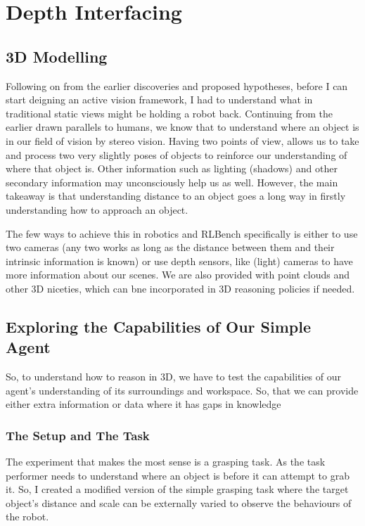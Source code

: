 \section{Depth Interfacing} 


\subsection{3D Modelling} 
Following on from the earlier discoveries and proposed hypotheses, before I can start deigning an active vision framework, I had to understand what in traditional static views might be holding a robot back. Continuing from the earlier drawn parallels to humans, we know that to understand where an object is in our field of vision by stereo vision. Having two points of view, allows us to take and process two very slightly poses of objects to reinforce our understanding of where that object is. Other information such as lighting (shadows) and other secondary information may unconsciously help us as well. However, the main takeaway is that understanding distance to an object goes a long way in firstly understanding how to approach an object.

The few ways to achieve this in robotics and RLBench specifically is either to use two cameras (any two works as long as the distance between them and their intrinsic information is known) or use depth sensors, like (light) cameras to have more information about our scenes. We are also provided with point clouds and other 3D niceties, which can bne incorporated in 3D reasoning policies if needed.

\subsection{Exploring the Capabilities of Our Simple Agent}
So, to understand how to reason in 3D, we have to test the capabilities of our agent's understanding of its surroundings and workspace. So, that we can provide either extra information or data where it has gaps in knowledge

\subsubsection{The Setup and The Task}
The experiment that makes the most sense is a grasping task. As the task performer needs to understand where an object is before it can attempt to grab it. So, I created a modified version of the simple grasping task where the target object's distance and scale can be externally varied to observe the behaviours of the robot.

